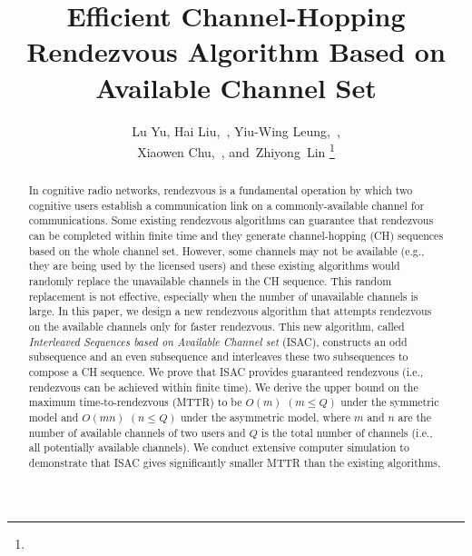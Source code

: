 \documentclass[journal]{IEEEtran}
\begin{document}
\title{Efficient Channel-Hopping Rendezvous Algorithm Based on Available Channel Set}


\author{Lu Yu, Hai Liu,~, Yiu-Wing Leung,~, \\Xiaowen Chu,~, and~Zhiyong~Lin
\thanks{}}


\maketitle


\begin{abstract}
In cognitive radio networks, rendezvous is a fundamental operation by which two cognitive users establish a communication link on a commonly-available channel for communications. Some existing rendezvous algorithms can guarantee that rendezvous can be completed within finite time and they generate channel-hopping (CH) sequences based on the whole channel set. However, some channels may not be available (e.g., they are being used by the licensed users) and these existing algorithms would randomly replace the unavailable channels in the CH sequence. This random replacement is not effective, especially when the number of unavailable channels is large. In this paper, we design a new rendezvous algorithm that attempts rendezvous on the available channels only for faster rendezvous. This new algorithm, called \emph{Interleaved Sequences based on Available Channel set} (ISAC), constructs an odd subsequence and an even subsequence and interleaves these two subsequences to compose a CH sequence. We prove that ISAC provides guaranteed rendezvous (i.e., rendezvous can be achieved within finite time). We derive the upper bound on the maximum time-to-rendezvous (MTTR) to be $O(m)$ $(m\leq Q)$ under the symmetric model and $O(mn)$ $(n\leq Q)$ under the asymmetric model, where $m$ and $n$ are the number of available channels of two users and  $Q$ is the total number of channels (i.e., all potentially available channels). We conduct extensive computer simulation to demonstrate that ISAC gives significantly smaller MTTR than the existing algorithms.
\end{abstract}
\end{document}
